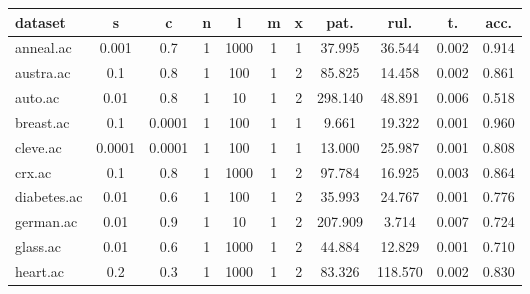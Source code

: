 \begin{table}[htbp]
	\centering
		\begin{tabular}{|l|c|c|c|c|c|c|c|c|c|c|}
		\hline
		\textbf{dataset}	& \textbf{s}	& \textbf{c}	& \textbf{n}	& \textbf{l}	& \textbf{m}	& \textbf{x}	& \textbf{pat.}	& \textbf{rul.}	& \textbf{t.}	& \textbf{acc.}	\\
		\hline
		anneal.ac      & 0.001    & 0.7         & 1              & 1000                & 1             & 1             & 37.995         & 36.544         & 0.002          & 0.914          \\
		\hline
		austra.ac      & 0.1      & 0.8         & 1              & 100                 & 1             & 2             & 85.825         & 14.458         & 0.002          & 0.861          \\
		\hline
		auto.ac        & 0.01     & 0.8         & 1              & 10                  & 1             & 2             & 298.140        & 48.891         & 0.006          & 0.518          \\
		\hline
		breast.ac      & 0.1      & 0.0001      & 1              & 100                 & 1             & 1             & 9.661          & 19.322         & 0.001          & 0.960          \\
		\hline
		cleve.ac       & 0.0001   & 0.0001      & 1              & 100                 & 1             & 1             & 13.000         & 25.987         & 0.001          & 0.808          \\
		\hline
		crx.ac         & 0.1      & 0.8         & 1              & 1000                & 1             & 2             & 97.784         & 16.925         & 0.003          & 0.864          \\
		\hline
		diabetes.ac    & 0.01     & 0.6         & 1              & 100                 & 1             & 2             & 35.993         & 24.767         & 0.001          & 0.776          \\
		\hline
		german.ac      & 0.01     & 0.9         & 1              & 10                  & 1             & 2             & 207.909        & 3.714          & 0.007          & 0.724          \\
		\hline
		glass.ac       & 0.01     & 0.6         & 1              & 1000                & 1             & 2             & 44.884         & 12.829         & 0.001          & 0.710          \\
		\hline
		heart.ac       & 0.2      & 0.3         & 1              & 1000                & 1             & 2             & 83.326         & 118.570        & 0.002          & 0.830          \\

\end{tabular}
\end{table}

